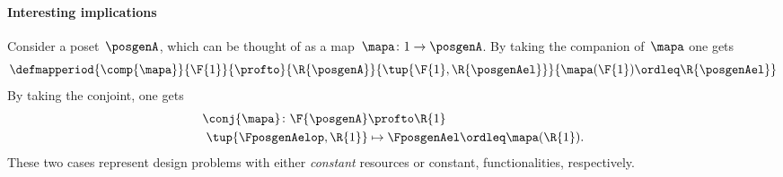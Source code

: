 \paragraph{Interesting implications}
Consider a poset~$\posgenA$, which can be thought of as a map~$\mapa \colon 1\to \posgenA$.
By taking the companion of~$\mapa$ one gets
\begin{equation}
	\defmapperiod{
		\comp{\mapa}
	}{
		\F{1}
	}{
		\profto
	}{
		\R{\posgenA}
	}{
		\tup{\F{1},\R{\posgenAel}}
	}{
		\mapa(\F{1})\ordleq \R{\posgenAel}
	}
\end{equation}
By taking the conjoint, one gets
\begin{equation}
	\begin{aligned}
		\conj{\mapa}\colon \F{\posgenA} & \profto \R{1}                            \\
		\tup{\FposgenAelop,\R{1}}       & \mapsto \FposgenAel\ordleq \mapa(\R{1}).
	\end{aligned}
\end{equation}
These two cases represent design problems with either \emph{constant} resources or constant, functionalities, respectively.
